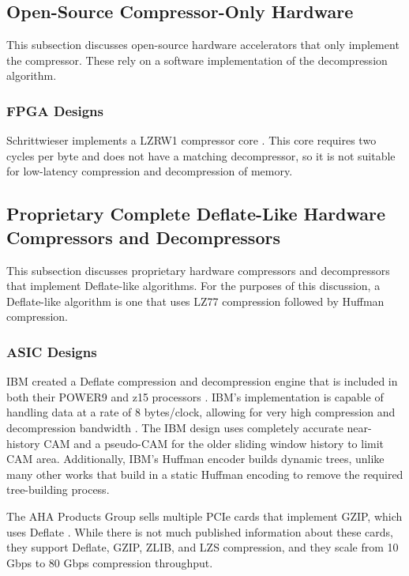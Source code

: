 \documentclass[doublespace,nopageskip]{VTthesis}
\begin{document}
\subsection{Open-Source Compressor-Only Hardware}\label{ss:open-source_compressor-only_hardware}
This subsection discusses open-source hardware accelerators that only implement the compressor. These rely on a software implementation of the decompression algorithm.
\subsubsection{FPGA Designs}\label{sss:open_fpga_compressor_designs}
Schrittwieser implements a LZRW1 compressor core \cite{lzrw1}. This core requires two cycles per byte and does not have a matching decompressor, so it is not suitable for low-latency compression and decompression of memory.

\subsection{Proprietary Complete Deflate-Like Hardware Compressors and Decompressors}\label{ss:complete_deflate-like_hardware_compressors_and_decompressors}
This subsection discusses proprietary hardware compressors and decompressors that implement Deflate-like algorithms. For the purposes of this discussion, a Deflate-like algorithm is one that uses LZ77 compression followed by Huffman compression.

\subsubsection{ASIC Designs}\label{sss:asic_designs}
IBM created a Deflate compression and decompression engine that is included in both their POWER9 and z15 processors \cite{ibm}. IBM's implementation is capable of handling data at a rate of 8 bytes/clock, allowing for very high compression and decompression bandwidth \cite{ibm}. The IBM design uses completely accurate near-history CAM and a pseudo-CAM for the older sliding window history to limit CAM area. Additionally, IBM's Huffman encoder builds dynamic trees, unlike many other works that build in a static Huffman encoding to remove the required tree-building process.

The AHA Products Group sells multiple PCIe cards that implement GZIP, which uses Deflate \cite{aha}. While there is not much published information about these cards, they support Deflate, GZIP, ZLIB, and LZS compression, and they scale from 10 Gbps to 80 Gbps compression throughput.
\end{document}

